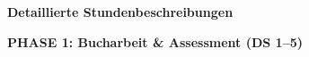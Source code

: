 \documentclass[11pt, a4paper]{article}
\begin{document}
\normalsize
\renewcommand{\arraystretch}{1.0}

\newpage


{\Large\bfseries\color{spanisch} Detaillierte Stundenbeschreibungen}

\vspace{0.4cm}


\textbf{\Large\color{spanisch} PHASE 1: Bucharbeit \& Assessment (DS 1--5)}

\vspace{0.3cm}
\end{document}
